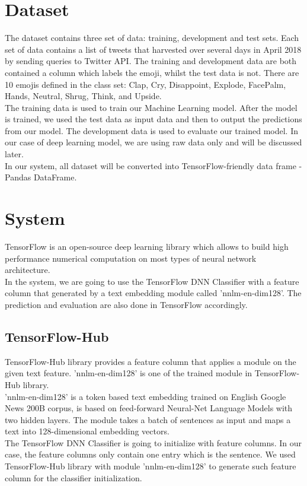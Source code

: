 \documentclass[12pt]{article}
\begin{document}
\section{Dataset}
The dataset contains three set of data: training, development and test sets. Each set of data contains a list of tweets that harvested over several days in April 2018 by sending queries to Twitter API. The training and development data are both contained a column which labels the emoji, whilst the test data is not. There are 10 emojis defined in the class set: Clap, Cry, Disappoint, Explode, FacePalm, Hands, Neutral, Shrug, Think, and Upside.
\medskip \\
The training data is used to train our Machine Learning model. After the model is trained, we used the test data as input data and then to output the predictions from our model. The development data is used to evaluate our trained model. In our case of deep learning model, we are using raw data only and will be discussed later.
\medskip \\
In our system, all dataset will be converted into TensorFlow-friendly data frame - Pandas DataFrame.

\section{System}
TensorFlow is an open-source deep learning library which allows to build high performance numerical computation on most types of neural network architecture. 
\medskip \\
In the system, we are going to use the TensorFlow DNN Classifier with a feature column that generated by a text embedding module called 'nnlm-en-dim128'. The prediction and evaluation are also done in TensorFlow accordingly.

\subsection{TensorFlow-Hub}
TensorFlow-Hub library provides a feature column that applies a module on the given text feature. 'nnlm-en-dim128' is one of the trained module in TensorFlow-Hub library.
\medskip \\
'nnlm-en-dim128' is a token based text embedding trained on English Google News 200B corpus, is based on feed-forward Neural-Net Language Models \cite{nnlm} with two hidden layers. The module takes a batch of sentences as input and maps a text into 128-dimensional embedding vectors.
\medskip \\
The TensorFlow DNN Classifier is going to initialize with feature columns. In our case, the feature columns only contain one entry which is the sentence. We used TensorFlow-Hub library with module 'nnlm-en-dim128' to generate such feature column for the classifier initialization.
\end{document}
